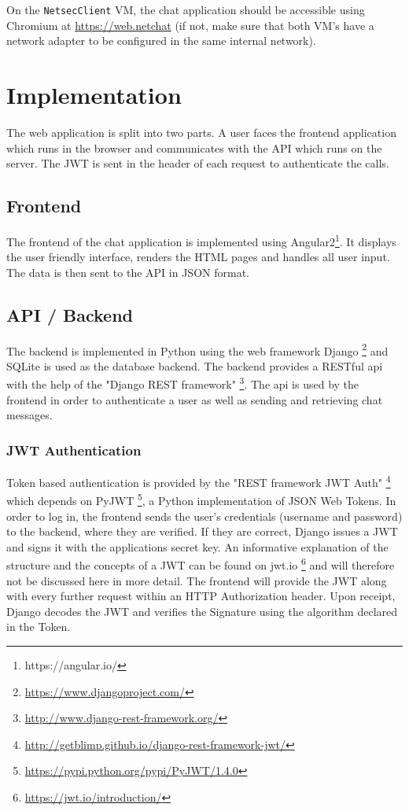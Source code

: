 \documentclass[12pt,a4paper]{article}
\newcommand{\code}[1]{\texttt{#1}}
\begin{document}
On the \code{NetsecClient} VM, the chat application should be accessible using Chromium at \url{https://web.netchat} (if not, make sure that both VM's have a network adapter to be configured in the same internal network).

\section{Implementation}

The web application is split into two parts. A user faces the frontend application which runs in the browser and communicates with the API which runs on the server. The JWT is sent in the header of each request to authenticate the calls.

\subsection{Frontend}
The frontend of the chat application is implemented using Angular2\footnote{https://angular.io/}. It displays the user friendly interface, renders the HTML pages and handles all user input. The data is then sent to the API in JSON format. 
 
\subsection{API / Backend}
The backend is implemented in Python using the web framework Django \footnote{\url{https://www.djangoproject.com/}} and SQLite is used as the database backend. The backend provides a RESTful api with the help of the "Django REST framework" \footnote{\url{http://www.django-rest-framework.org/}}. The api is used by the frontend in order to authenticate a user as well as sending and retrieving chat messages. 

\subsubsection{JWT Authentication}
Token based authentication is provided by the "REST framework JWT Auth" \footnote{\url{http://getblimp.github.io/django-rest-framework-jwt/}} which depends on PyJWT \footnote{\url{https://pypi.python.org/pypi/PyJWT/1.4.0}}, a Python implementation of JSON Web Tokens. In order to log in, the frontend sends the user's credentials (username and password) to the backend, where they are verified. If they are correct, Django issues a JWT and signs it with the applications secret key. An informative explanation of the structure and the concepts of a JWT can be found on jwt.io \footnote{\url{https://jwt.io/introduction/}} and will therefore not be discussed here in more detail. 
The frontend will provide the JWT along with every further request within an HTTP Authorization header. Upon receipt, Django decodes the JWT and verifies the Signature using the algorithm declared in the Token.
\end{document}
